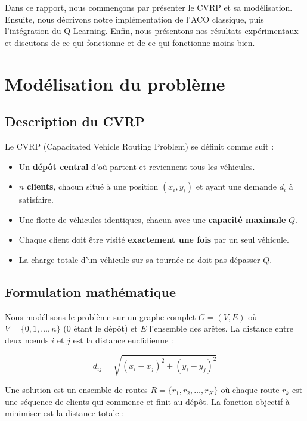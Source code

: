 \documentclass[12pt, a4paper]{article}
\begin{document}
Dans ce rapport, nous commençons par présenter le CVRP et sa modélisation. Ensuite, nous décrivons notre implémentation de l'ACO classique, puis l'intégration du Q-Learning. Enfin, nous présentons nos résultats expérimentaux et discutons de ce qui fonctionne et de ce qui fonctionne moins bien.

\section{Modélisation du problème}

\subsection{Description du CVRP}

Le CVRP (Capacitated Vehicle Routing Problem) se définit comme suit :

\begin{itemize}
    \item Un \textbf{dépôt central} d'où partent et reviennent tous les véhicules.
    \item $n$ \textbf{clients}, chacun situé à une position $(x_i, y_i)$ et ayant une demande $d_i$ à satisfaire.
    \item Une flotte de véhicules identiques, chacun avec une \textbf{capacité maximale} $Q$.
    \item Chaque client doit être visité \textbf{exactement une fois} par un seul véhicule.
    \item La charge totale d'un véhicule sur sa tournée ne doit pas dépasser $Q$.
\end{itemize}

\subsection{Formulation mathématique}

Nous modélisons le problème sur un graphe complet $G = (V, E)$ où $V = \{0, 1, \ldots, n\}$ ($0$ étant le dépôt) et $E$ l'ensemble des arêtes. La distance entre deux n\oe uds $i$ et $j$ est la distance euclidienne :

\begin{equation}
    d_{ij} = \sqrt{(x_i - x_j)^2 + (y_i - y_j)^2}
\end{equation}

Une solution est un ensemble de routes $R = \{r_1, r_2, \ldots, r_K\}$ où chaque route $r_k$ est une séquence de clients qui commence et finit au dépôt. La fonction objectif à minimiser est la distance totale :
\end{document}
